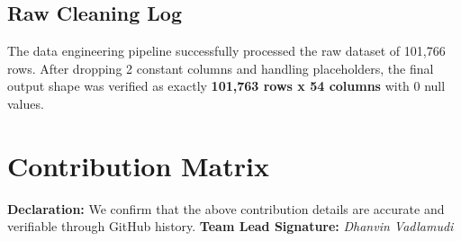 \documentclass[12pt,a4paper]{article}
\begin{document}
\subsection{Raw Cleaning Log}
The data engineering pipeline successfully processed the raw dataset of 101,766 rows. After dropping 2 constant columns and handling placeholders, the final output shape was verified as exactly \textbf{101,763 rows x 54 columns} with 0 null values.

\section{Contribution Matrix}
\begin{table}[H]
\centering
{}
\end{table}

\textbf{Declaration:} We confirm that the above contribution details are accurate and verifiable through GitHub history.
\textbf{Team Lead Signature:} \textit{Dhanvin Vadlamudi}
\end{document}
